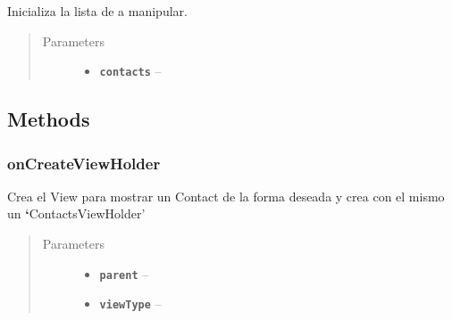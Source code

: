 \documentclass[letterpaper,10pt,english]{sphinxmanual}
\begin{document}
\begin{fulllineitems}
\label{Adapter/ContactsAdapter:com.fiuba.tallerii.jobify.ContactsAdapter.ContactsAdapter(List)}
Inicializa la lista de  a manipular.
\begin{quote}\begin{description}
\item[{Parameters}] \leavevmode\begin{itemize}
\item {} 
\textbf{\texttt{contacts}} -- 

\end{itemize}

\end{description}\end{quote}

\end{fulllineitems}



\subsection{Methods}
\label{Adapter/ContactsAdapter:methods}

\subsubsection{onCreateViewHolder}
\label{Adapter/ContactsAdapter:oncreateviewholder}

\begin{fulllineitems}
\label{Adapter/ContactsAdapter:com.fiuba.tallerii.jobify.ContactsAdapter.onCreateViewHolder(ViewGroup, int)}
Crea el View para mostrar un Contact de la forma deseada y crea con el mismo un {\color{red}\bfseries{}{}`}ContactsViewHolder'
\begin{quote}\begin{description}
\item[{Parameters}] \leavevmode\begin{itemize}
\item {} 
\textbf{\texttt{parent}} -- 

\item {} 
\textbf{\texttt{viewType}} -- 

\end{itemize}

\end{description}\end{quote}

\end{fulllineitems}
\end{document}
